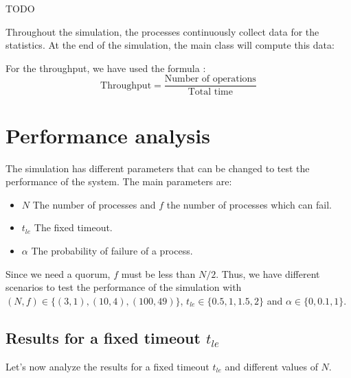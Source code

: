 \documentclass{article}
\begin{document}
TODO

Throughout the simulation, the processes continuously collect data for
the statistics. At the end of the simulation, the main class will compute this data:


For the throughput, we have used the formula :
$$
\text{Throughput} = \frac{\text{Number of operations}}{\text{Total time}}
$$

\newpage

\section{Performance analysis}
The simulation has different parameters that can be changed to test the performance of the system. The main parameters are:

\begin{itemize}
    \item $N$ The number of processes and $f$ the number of processes which can fail.
    \item $t_{le}$ The fixed timeout.
    \item $\alpha$ The probability of failure of a process.
\end{itemize}

Since we need a quorum, $f$ must be less than $N/2$. Thus,
we have different scenarios to test the performance of the simulation
with $(N,f) \in \{(3,1),(10,4),(100,49)\}$, $t_{le} \in \{0.5,1,1.5,2\}$ and $\alpha \in \{0,0.1,1\}$.

\subsection{Results for a fixed timeout $t_{le}$}
Let's now analyze the results for a fixed timeout $t_{le}$ and different values of $N$.
\end{document}
